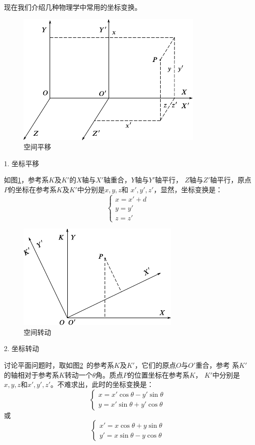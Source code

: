 现在我们介绍几种物理学中常用的坐标变换。

\begin{figure}
  \centering
  \includegraphics{figure/fig02.02}
  \caption{空间平移}
  \label{fig:02.02}
\end{figure}
\textsf{1. 坐标平移}

如图\ref{fig:02.02}，参考系$K$及$K'$的$X$轴与$X'$轴重合，$Y$轴与$Y'$轴平行，
$Z$轴与$Z'$轴平行，原点$P$的坐标在参考系$K$及$K'$中分别是$x,y,z$和
$x',y',z'$，显然，坐标变换是：
\begin{equation}\label{eqn:02.02.03}
  \left\{\begin{array}{l}
    x=x'+d \\
    y=y'   \\
    z=z'
  \end{array}\right.
\end{equation}

\begin{figure}
  \centering
  \includegraphics{figure/fig02.03}
  \caption{空间转动}
  \label{fig:02.03}
\end{figure}
\textsf{2. 坐标转动}

讨论平面问题时，取如图\ref{fig:02.03}~的参考系$K$及$K'$，它们的原点$O$与$O'$重合，参考
系$K'$的轴相对于参考系$ K $转动一个$\theta$角。质点$P$的位置坐标在参考系$K$，
$K'$中分别是$x,y,z$和$x',y',z'$。不难求出，此时的坐标变换是：
\begin{equation}\label{eqn:02.02.04}
  \left\{\begin{array}{l}
    x=x'\cos\theta-y'\sin\theta \\
    y=x'\sin\theta+y'\cos\theta
  \end{array}\right.
\end{equation}
或
\begin{equation*}
  \left\{\begin{array}{l}
    x'=x\cos\theta+y\sin\theta \\
    y'=x\sin\theta-y\cos\theta
  \end{array}\right.
\end{equation*}


